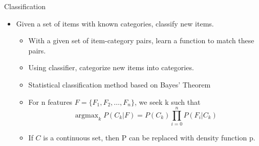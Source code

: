 \documentclass[11pt]{beamer}
\DeclareMathOperator*{\argmax}{argmax}
\begin{document}
\begin{frame}{Classification}
\begin{itemize}
    \item Given a set of items with known categories, classify new items.
    \begin{itemize}
        \item With a given set of item-category pairs, learn a function to match these pairs.
        \item Using classifier, categorize new items into categories.
    \end{itemize}
    \begin{itemize}
        \item Statistical classification method based on Bayes' Theorem
        \item For n features $F = \{F_1, F_2, \ldots, F_n\}$, we seek k such that \\
                \[\argmax_k P(C_k | F) = P(C_k) \prod_{i=0}^{n} P(F_i | C_k)\]
        \item If $C$ is a continuous set, then P can be replaced with density function p.
    \end{itemize}
\end{itemize}
\end{frame}
\end{document}
